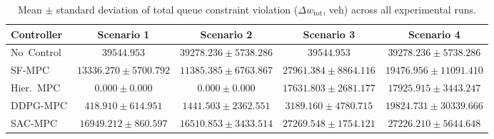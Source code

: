 \begin{table}[htbp]
\centering
\caption{Mean $\pm$ standard deviation of total queue constraint violation ($\Delta w_{\mathrm{tot}}$, veh) across all experimental runs.}
\label{tab:dw_tot_comparison}
\begin{tabular}{lcccc}
\toprule
Controller & Scenario 1 & Scenario 2 & Scenario 3 & Scenario 4 \\
\midrule
No~Control & $39544.953$ & $39278.236 \pm 5738.286$ & $39544.953$ & $39278.236 \pm 5738.286$ \\
SF-MPC & $13336.270 \pm 5700.792$ & $11385.385 \pm 6763.867$ & $27961.384 \pm 8864.116$ & $19476.956 \pm 11091.410$ \\
Hier.~MPC & $0.000 \pm 0.000$ & $0.000 \pm 0.000$ & $17631.803 \pm 2681.177$ & $17925.915 \pm 3443.247$ \\
DDPG-MPC & $418.910 \pm 614.951$ & $1441.503 \pm 2362.551$ & $3189.160 \pm 4780.715$ & $19824.731 \pm 30339.666$ \\
SAC-MPC & $16949.212 \pm 860.597$ & $16510.853 \pm 3433.514$ & $27269.548 \pm 1754.121$ & $27226.210 \pm 5644.648$ \\
\bottomrule
\end{tabular}
\end{table}
